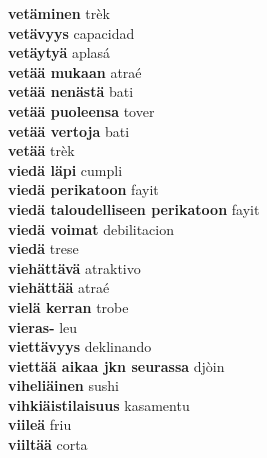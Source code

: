 \textbf{ vetäminen  } trèk \\
\textbf{ vetävyys  } capacidad \\
\textbf{ vetäytyä  } aplasá \\
\textbf{ vetää mukaan  } atraé \\
\textbf{ vetää nenästä  } bati \\
\textbf{ vetää puoleensa  } tover \\
\textbf{ vetää vertoja  } bati \\
\textbf{ vetää  } trèk \\
\textbf{ viedä läpi  } cumpli \\
\textbf{ viedä perikatoon  } fayit \\
\textbf{ viedä taloudelliseen perikatoon  } fayit \\
\textbf{ viedä voimat  } debilitacion \\
\textbf{ viedä  } trese \\
\textbf{ viehättävä  } atraktivo \\
\textbf{ viehättää  } atraé \\
\textbf{ vielä kerran  } trobe \\
\textbf{ vieras-  } leu \\
\textbf{ viettävyys  } deklinando \\
\textbf{ viettää aikaa jkn seurassa  } djòin \\
\textbf{ viheliäinen  } sushi \\
\textbf{ vihkiäistilaisuus  } kasamentu \\
\textbf{ viileä  } friu \\
\textbf{ viiltää  } corta \\
